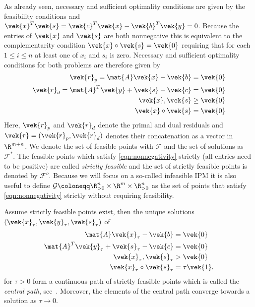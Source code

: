 As already seen, necessary and sufficient optimality conditions are given by the feasibility conditions and \(\vek{x}^T \vek{s} = \vek{c}^T \vek{x} - \vek{b}^T \vek{y} = 0\).
Because the entries of \(\vek{x}\) and \(\vek{s}\) are both nonnegative this is equivalent to the complementarity condition \(\vek{x} \circ \vek{s} = \vek{0}\) requiring that for each \(1 \leq i \leq n\) at least one of \(x_i\) and \(s_i\) is zero.
Necessary and sufficient optimality conditions for both problems are therefore given by
\begin{subequations}\label{eqn:optimality-conditions}
  \begin{align}
    \label{eqn:primal-feasibility}
    \vek{r}_p = \mat{A}\vek{x} - \vek{b} &= \vek{0} \\
    \label{eqn:dual-feasibility}
    \vek{r}_d = \mat{A}^T \vek{y} + \vek{s} - \vek{c} &= \vek{0} \\
    \label{eqn:nonnegativity}
    \vek{x}, \vek{s} &\geq \vek{0} \\
    \label{eqn:complementarity}
    \vek{x} \circ \vek{s} &= \vek{0}
  \end{align}
\end{subequations}
Here, \(\vek{r}_p\) and \(\vek{r}_d\) denote the primal and dual residuals and \(\vek{r} = (\vek{r}_p, \vek{r}_d)\) denotes their concatenation as a vector in \(\R^{m+n}\).
We denote the set of feasible points with \(\mathcal{F}\) and the set of solutions as \(\mathcal{F}^*\).
The feasible points which satisfy \cref{eqn:nonnegativity} strictly (all entries need to be positive) are called \emph{strictly feasible} and the set of strictly feasible points is denoted by \(\mathcal{F}^o\).
Because we will focus on a so-called infeasible IPM it is also useful to define \(\mathcal{G} \coloneqq \R^n_{>0} \times \R^m \times \R^n_{>0}\) as the set of points that satisfy \cref{eqn:nonnegativity} strictly without requiring feasibility.

Assume strictly feasible points exist, then the unique solutions \((\vek{x}_\tau, \vek{y}_\tau, \vek{s}_\tau)\) of
\begin{subequations}
  \begin{align}
    \mat{A}\vek{x}_\tau - \vek{b} &= \vek{0} \\
    \mat{A}^T \vek{y}_\tau + \vek{s}_\tau - \vek{c} &= \vek{0} \\
    \vek{x}_\tau, \vek{s}_\tau &> \vek{0} \label{eqn:strict-nonnegativity} \\
    \vek{x}_\tau \circ \vek{s}_\tau &= \tau \vek{1}.
  \end{align}
\end{subequations}
for \(\tau > 0\) form a continuous path of strictly feasible points which is called the \emph{central path}, see~\cite[Theorem 2.8]{Wright-PrimalDualInteriorPointMethods}.
Moreover, the elements of the central path converge towards a solution as \(\tau \to 0\).

